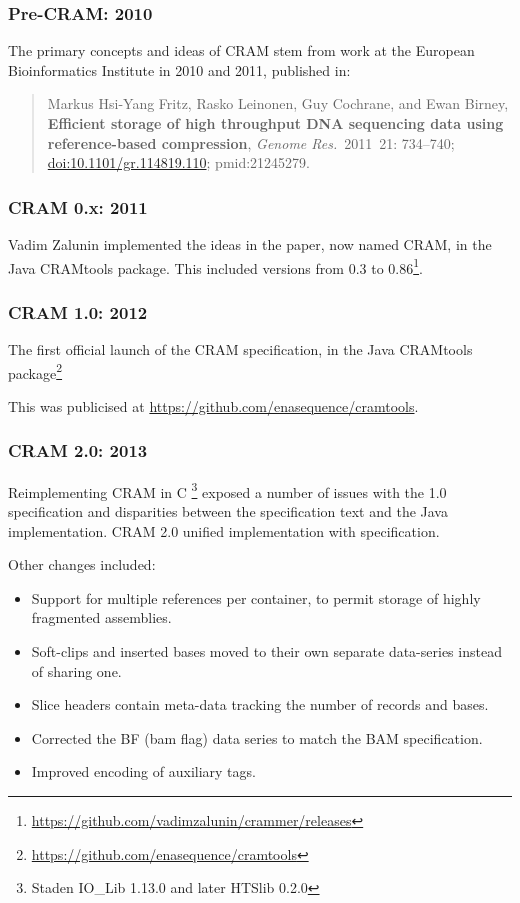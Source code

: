 \documentclass[a4paper]{article}
\begin{document}
\subsubsection*{Pre-CRAM: 2010}

The primary concepts and ideas of CRAM stem from work at the European
Bioinformatics Institute in 2010 and 2011, published in:

\begin{quote}\small
Markus Hsi-Yang Fritz,
Rasko Leinonen, Guy Cochrane, and Ewan Birney,
\textbf{Efficient storage of high throughput DNA sequencing data using reference-based compression},
{\sl Genome Res.}~2011~21: 734--740;
\href{http://dx.doi.org/doi:10.1101/gr.114819.110}{doi:10.1101/gr.114819.110};
{\sc pmid:}21245279.
\end{quote}

\subsubsection*{CRAM 0.x: 2011}

Vadim Zalunin implemented the ideas in the paper, now named CRAM, in
the Java CRAMtools package.  This included versions from 0.3 to 0.86\footnote{\url{https://github.com/vadimzalunin/crammer/releases}}.

\subsubsection*{CRAM 1.0: 2012}

The first official launch of the CRAM specification, in the Java
CRAMtools package\footnote{\url{https://github.com/enasequence/cramtools}}

This was publicised at \url{https://github.com/enasequence/cramtools}.

\subsubsection*{CRAM 2.0: 2013}

Reimplementing CRAM in C
\footnote{Staden IO\_Lib 1.13.0 and later HTSlib 0.2.0} exposed a number of issues with the
1.0 specification and disparities between the specification text and
the Java implementation.  CRAM 2.0 unified implementation with
specification.

Other changes included:

\begin{itemize}
\item Support for multiple references per container, to permit storage
of highly fragmented assemblies.

\item Soft-clips and inserted bases moved to their own separate
data-series instead of sharing one.

\item Slice headers contain meta-data tracking the number of records
and bases.

\item Corrected the BF (bam flag) data series to match the BAM
specification.

\item Improved encoding of auxiliary tags.
\end{itemize}
\end{document}
